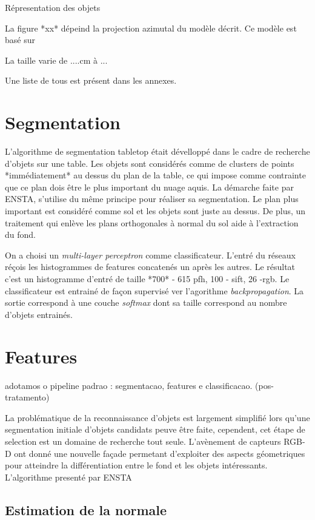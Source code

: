 Répresentation des objets

La figure *xx* dépeind la projection azimutal du modèle décrit. Ce modèle est basé sur 


La taille varie de ....cm à ...


 Une liste de tous est présent dans les annexes.


\section{Segmentation}

L’algorithme de segmentation tabletop était dévelloppé dans le cadre de recherche d’objets sur une table. Les objets sont considérés comme de clusters de points *immédiatement* au dessus du plan de la table, ce qui impose comme contrainte que ce plan dois être le plus important du nuage aquis.
La démarche faite par ENSTA, s'utilise du même principe pour réaliser sa segmentation. Le plan plus important est considéré comme sol et les objets sont juste au dessus. De plus, un traitement qui enlève les plans orthogonales à normal du sol aide à l'extraction du fond.

On a choisi un \textit{multi-layer perceptron} comme classificateur. L'entré du réseaux réçois les histogrammes de features concatenés un après les autres. Le résultat c'est un histogramme d'entré de taille *700* - 615 pfh, 100 - sift, 26 -rgb. Le classificateur est entrainé de façon supervisé ver l'agorithme \textit{backpropagation}. La sortie correspond à une couche \textit{softmax} dont sa taille correspond au nombre d'objets entrainés.


\section{Features}

adotamos o pipeline padrao :  segmentacao, features e classificacao. (pos-tratamento)

La problématique de la reconnaissance d'objets est largement simplifié lors qu'une segmentation initiale d'objets candidats peuve être faite, cependent, cet étape de selection est un domaine de recherche tout seule. L'avènement de capteurs RGB-D ont donné une nouvelle façade permetant d'exploiter des aspects géometriques pour atteindre la différentiation entre le fond et les objets intéressants. L'algorithme presenté par {\color{blue} ENSTA}

 
\subsection{Estimation de la normale}

